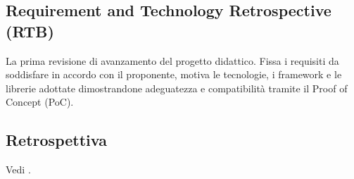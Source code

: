 \subsection*{Requirement and Technology Retrospective (RTB)}
La prima revisione di avanzamento del progetto didattico. Fissa i requisiti da soddisfare in accordo con il proponente, motiva le tecnologie, i framework 
e le librerie adottate dimostrandone adeguatezza e compatibilità tramite il Proof of Concept (PoC).

\subsection*{Retrospettiva}
Vedi .

\newpage